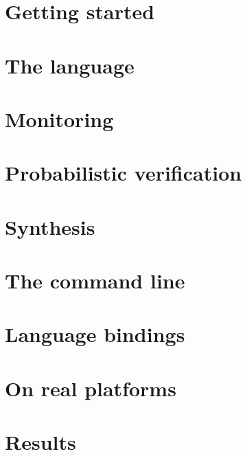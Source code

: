 \documentclass[11pt,openright]{book}
\begin{document}
\frontmatter

\tableofcontents

\mainmatter
\part{Getting started}



\part{The language}



\part{Monitoring}





\part{Probabilistic verification}




\part{Synthesis}




\part{The command line}


\part{Language bindings}



\part{On real platforms}







\part{Results}



\appendix


\end{document}
